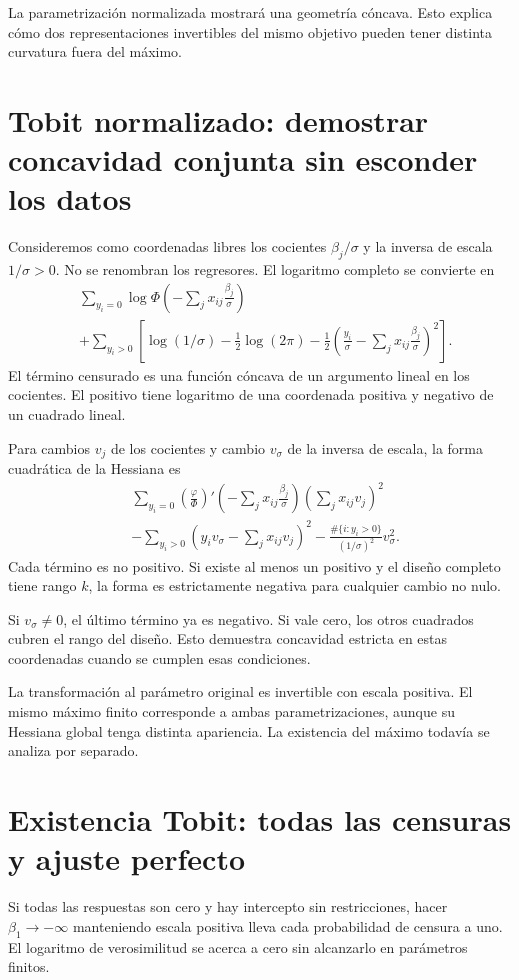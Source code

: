 \documentclass[11pt,a4paper]{article}
\begin{document}
La parametrización normalizada
mostrará una geometría cóncava.
Esto explica cómo dos
representaciones invertibles del
mismo objetivo pueden tener
distinta curvatura fuera del máximo.

\clearpage
\section{Tobit normalizado: demostrar concavidad conjunta sin esconder los datos}\label{unidad98}
Consideremos como coordenadas libres
los cocientes \(\beta_j/\sigma\)
y la inversa de escala \(1/\sigma>0\).
No se renombran los regresores.
El logaritmo completo se convierte en
\[
\begin{aligned}
&\sum_{y_i=0}\log\Phi\left(-\sum_jx_{ij}\frac{\beta_j}{\sigma}\right)\\
&+\sum_{y_i>0}\left[
\log(1/\sigma)-\tfrac12\log(2\pi)
-\frac12\left(\frac{y_i}{\sigma}
-\sum_jx_{ij}\frac{\beta_j}{\sigma}\right)^2
\right].
\end{aligned}
\]
El término censurado es una
función cóncava de un
argumento lineal en los cocientes.
El positivo tiene logaritmo de
una coordenada positiva y
negativo de un cuadrado lineal.

Para cambios \(v_j\) de los
cocientes y cambio \(v_\sigma\)
de la inversa de escala,
la forma cuadrática de la Hessiana es
\[
\begin{aligned}
&\sum_{y_i=0}
\left(\frac{\varphi}{\Phi}\right)'
\left(-\sum_jx_{ij}\frac{\beta_j}{\sigma}\right)
\left(\sum_jx_{ij}v_j\right)^2\\
&-\sum_{y_i>0}
\left(y_iv_\sigma-\sum_jx_{ij}v_j\right)^2
-\frac{\#\{i:y_i>0\}}{(1/\sigma)^2}v_\sigma^2.
\end{aligned}
\]
Cada término es no positivo.
Si existe al menos un positivo
y el diseño completo tiene rango \(k\),
la forma es estrictamente negativa
para cualquier cambio no nulo.

Si \(v_\sigma\ne0\),
el último término ya es negativo.
Si vale cero, los otros
cuadrados cubren el rango del diseño.
Esto demuestra concavidad estricta
en estas coordenadas cuando
se cumplen esas condiciones.

La transformación al parámetro original
es invertible con escala positiva.
El mismo máximo finito corresponde
a ambas parametrizaciones,
aunque su Hessiana global
tenga distinta apariencia.
La existencia del máximo todavía
se analiza por separado.

\clearpage
\section{Existencia Tobit: todas las censuras y ajuste perfecto}\label{unidad99}
Si todas las respuestas son cero
y hay intercepto sin restricciones,
hacer \(\beta_1\to-\infty\)
manteniendo escala positiva
lleva cada probabilidad de censura a uno.
El logaritmo de verosimilitud
se acerca a cero sin
alcanzarlo en parámetros finitos.
\end{document}
